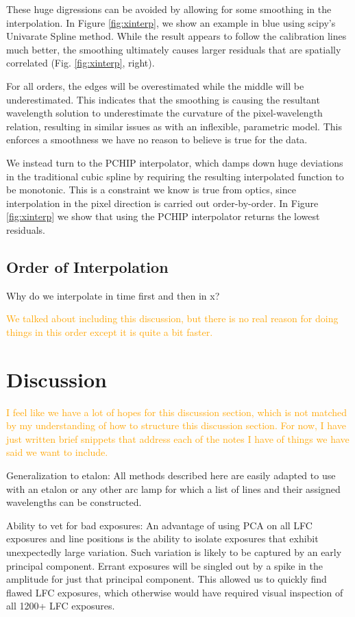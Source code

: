 \documentclass[twocolumn]{aastex63}
\newcommand{\lz}[1]{\textcolor{orange}{#1}}
\begin{document}
These huge digressions can be avoided by allowing for some smoothing in the interpolation.  In Figure \ref{fig:xinterp}, we show an example in blue using scipy's Univarate Spline method.  While the result appears to follow the calibration lines much better, the smoothing ultimately causes larger residuals that are spatially correlated (Fig. \ref{fig:xinterp}, right).

For all orders, the edges will be overestimated while the middle will be underestimated.  This indicates that the smoothing is causing the resultant wavelength solution to underestimate the curvature of the pixel-wavelength relation, resulting in similar issues as with an inflexible, parametric model.  This enforces a smoothness we have no reason to believe is true for the data.

We instead turn to the PCHIP interpolator, which damps down huge deviations in the traditional cubic spline by requiring the resulting interpolated function to be monotonic.  This is a constraint we know is true from optics, since interpolation in the pixel direction is carried out order-by-order.  In Figure \ref{fig:xinterp} we show that using the PCHIP interpolator returns the lowest residuals.

\subsection{Order of Interpolation}
Why do we interpolate in time first and then in x?

\lz{We talked about including this discussion, but there is no real reason for doing things in this order except it is quite a bit faster.}


\section{Discussion} \label{sec:discussion}
\lz{I feel like we have a lot of hopes for this discussion section, which is not matched by my understanding of how to structure this discussion section.  For now, I have just written brief snippets that address each of the notes I have of things we have said we want to include.}

Generalization to etalon:
All methods described here are easily adapted to use with an etalon or any other arc lamp for which a list of lines and their assigned wavelengths can be constructed.

Ability to vet for bad exposures:
An advantage of using PCA on all LFC exposures and line positions is the ability to isolate exposures that exhibit unexpectedly large variation.  Such variation is likely to be captured by an early principal component.  Errant exposures will be singled out by a spike in the amplitude for just that principal component.  This allowed us to quickly find flawed LFC exposures, which otherwise would have required visual inspection of all 1200+ LFC exposures.
\end{document}
